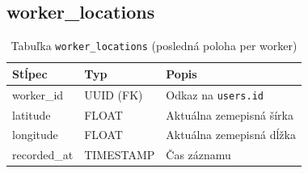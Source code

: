 \subsection{worker\_locations}
\begin{table}[H]
  \centering
  \begin{tabularx}{\textwidth}{llX}
    \toprule
    \textbf{Stĺpec} & \textbf{Typ} & \textbf{Popis} \\
    \midrule
    worker\_id  & UUID (FK) & Odkaz na \texttt{users.id} \\
    latitude    & FLOAT     & Aktuálna zemepisná šírka \\
    longitude   & FLOAT     & Aktuálna zemepisná dĺžka \\
    recorded\_at & TIMESTAMP & Čas záznamu \\
    \bottomrule
  \end{tabularx}
  \caption{Tabuľka \texttt{worker\_locations} (posledná poloha per worker)}
\end{table}